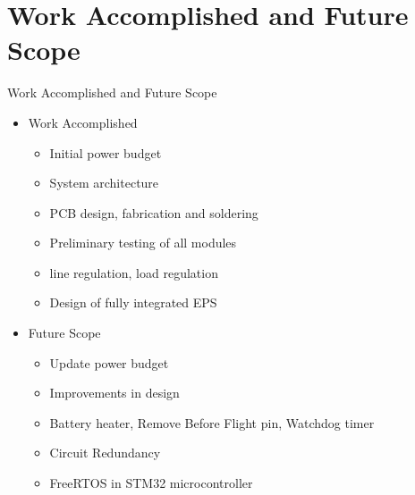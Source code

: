 \documentclass[aspectratio=169]{beamer}
\begin{document}
%
\section{Work Accomplished and Future Scope}
						\begin{frame}{Work Accomplished and Future Scope}
	\begin{itemize}
		\item Work Accomplished
		\begin{itemize}
			\item Initial power budget
			\item System architecture
			\item PCB design, fabrication and soldering 
			\item Preliminary testing of all modules
			\item line regulation, load regulation
			\item Design of fully integrated EPS
		\end{itemize}
	\end{itemize}
	\begin{itemize}
		\item Future Scope
		\begin{itemize}
			\item Update power budget
			\item Improvements in design
			\item Battery heater, Remove Before Flight pin, Watchdog timer
			\item Circuit Redundancy
			\item FreeRTOS in STM32 microcontroller
		\end{itemize}
	\end{itemize}
	\end{frame}
	
%			
	
\end{document}
